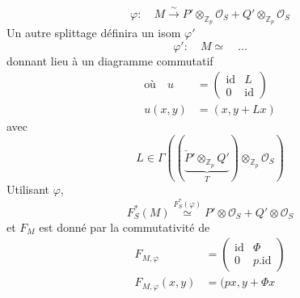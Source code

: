 \[
\varphi:\quad M\xrightarrow{\sim}P'\otimes_{\mathbb Z_p}\mathcal O_S+Q'\otimes_{\mathbb Z_p}\mathcal O_S
\]
Un autre splittage définira un  isom $\varphi'$
\[
\varphi':\quad M\simeq\quad\ldots
\]
donnant lieu à un diagramme commutatif
\[
\begin{aligned}
\text{où}\quad u&=\begin{pmatrix}\mathrm{id}&L\\0&\mathrm{id}\end{pmatrix}\\
u(x,y)&=(x,y+Lx)
\end{aligned}
\]
avec
\[
L\in\Gamma\left(\left(\underbrace{\check P'\otimes_{\mathbb Z_p}Q'}_{T}\right)\otimes_{\mathbb Z_p}\mathcal O_S\right)
\]
 Utilisant $\varphi$, 
\[
F_S^*(M)\overset{F_S^*(\varphi)}{\simeq} P'\otimes\mathcal O_S+Q'\otimes\mathcal O_S
\]
et $F_M$ est donné par la commutativité de
\[
\begin{aligned}
F_{M,\varphi}&=\begin{pmatrix}\mathrm{id}&\Phi\\0&p.\mathrm{id}\end{pmatrix}\\
F_{M,\varphi}(x,y)&=(px,y+\Phi x
\end{aligned}
\]
